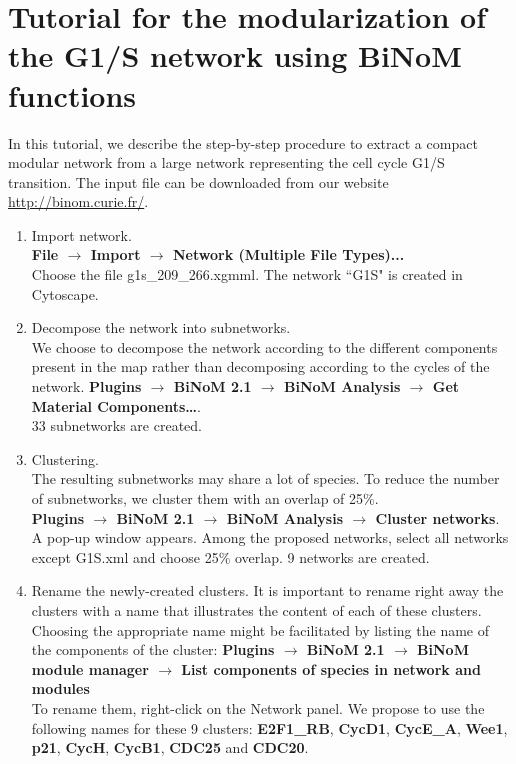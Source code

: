 \documentclass[a4paper,10pt]{article}
\begin{document}
\section*{Tutorial for the modularization of the G1/S network using BiNoM functions}
In this tutorial, we describe the step-by-step procedure to extract a compact
modular network from a large network representing the cell cycle G1/S
transition. The input file can be downloaded from our website
\url{http://binom.curie.fr/}.
\begin{enumerate}
\item Import network. \\
\textbf{File $\rightarrow$ Import $\rightarrow$ Network (Multiple File Types)...}\\
Choose the file g1s\_209\_266.xgmml.
The network ``G1S" is created in Cytoscape.


\item	Decompose the network into subnetworks. \\
We choose to decompose the network according to the different components present
in the map rather than decomposing according to the cycles of the network. 
\textbf{Plugins $\rightarrow$ BiNoM 2.1 $\rightarrow$ BiNoM Analysis $\rightarrow$ Get Material
Components…}.\\
33 subnetworks are created.

\item	Clustering. \\
The resulting subnetworks may share a lot of species. To reduce the number of
subnetworks, we cluster them with an overlap of 25\%. \\
\textbf{Plugins $\rightarrow$  BiNoM 2.1 $\rightarrow$ BiNoM Analysis $\rightarrow$ Cluster networks}. \\
A pop-up window appears. Among the proposed networks, select all networks except
G1S.xml and choose 25\% overlap. 9 networks are created.

\item	Rename the newly-created clusters.
It is important to rename right away the clusters with a name that illustrates
the content of each of these clusters. 
Choosing the appropriate name might be facilitated by listing the name of the
components of the cluster: \textbf{Plugins $\rightarrow$  BiNoM 2.1 $\rightarrow$ BiNoM module manager
$\rightarrow$ List components of species in network and modules} \\
To rename them, right-click on the Network panel.
We propose to use the following names for these 9 clusters: \textbf{E2F1\_RB},
\textbf{CycD1}, \textbf{CycE\_A}, \textbf{Wee1}, \textbf{p21}, \textbf{CycH}, \textbf{CycB1}, \textbf{CDC25} and \textbf{CDC20}.


\end{enumerate}
\end{document}
